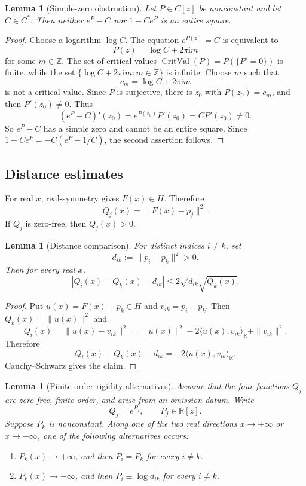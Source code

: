 \documentclass[11pt]{amsart}
\def\HH{H}%
\def\CC{C}%
\numberwithin{equation}{section}
\newtheorem{lemma}[theorem]{Lemma}
\theoremstyle{definition}
\theoremstyle{remark}
\newcommand{\HH}{\mathbb H}
\newcommand{\CC}{\mathbb C}
\newcommand{\RR}{\mathbb R}
\newcommand{\ZZ}{\mathbb Z}
\newcommand{\CritVal}{\operatorname{CritVal}}
\begin{document}
\begin{lemma}[Simple-zero obstruction]\label{lem:simple-zero}
Let $P\in\CC[z]$ be nonconstant and let $C\in\CC^*$. Then neither $e^P-C$ nor $1-Ce^P$ is an entire square.
\end{lemma}

\begin{proof}
Choose a logarithm $\log C$. The equation $e^{P(z)}=C$ is equivalent to
\[
P(z)=\log C+2\pi\mathrm i m
\]
for some $m\in\ZZ$. The set of critical values
$\CritVal(P)=P(\{P'=0\})$ is finite, while the set
$\{\log C+2\pi\mathrm i m:m\in\ZZ\}$ is infinite. Choose $m$ such that
\[
c_m=\log C+2\pi\mathrm i m
\]
is not a critical value. Since $P$ is surjective, there is $z_0$ with $P(z_0)=c_m$, and then $P'(z_0)\neq0$. Thus
\[
(e^P-C)'(z_0)=e^{P(z_0)}P'(z_0)=CP'(z_0)\neq0.
\]
So $e^P-C$ has a simple zero and cannot be an entire square. Since $1-Ce^P=-C(e^P-1/C)$, the second assertion follows.
\end{proof}

\subsection{Distance estimates}

For real $x$, real-symmetry gives $F(x)\in\HH$. Therefore
\[
Q_j(x)=\|F(x)-p_j\|^2.
\]
If $Q_j$ is zero-free, then $Q_j(x)>0$.

\begin{lemma}[Distance comparison]\label{lem:distance-comparison}
For distinct indices $i\neq k$, set
\[
d_{ik}:=\|p_i-p_k\|^2>0.
\]
Then for every real $x$,
\[
\left|Q_i(x)-Q_k(x)-d_{ik}\right|
\le
2\sqrt{d_{ik}}\sqrt{Q_k(x)}.
\]
\end{lemma}

\begin{proof}
Put $u(x)=F(x)-p_k\in\HH$ and $v_{ik}=p_i-p_k$. Then $Q_k(x)=\|u(x)\|^2$ and
\[
Q_i(x)=\|u(x)-v_{ik}\|^2=\|u(x)\|^2-2\langle u(x),v_{ik}\rangle_{\RR}+\|v_{ik}\|^2.
\]
Therefore
\[
Q_i(x)-Q_k(x)-d_{ik}=-2\langle u(x),v_{ik}\rangle_{\RR}.
\]
Cauchy--Schwarz gives the claim.
\end{proof}

\begin{lemma}[Finite-order rigidity alternatives]\label{lem:rigidity-alternatives}
Assume that the four functions $Q_j$ are zero-free, finite-order, and arise from an omission datum. Write
\[
Q_j=e^{P_j},\qquad P_j\in\RR[z].
\]
Suppose $P_k$ is nonconstant. Along one of the two real directions $x\to+\infty$ or $x\to-\infty$, one of the following alternatives occurs:
\begin{enumerate}[label=(\Alph*)]
\item $P_k(x)\to+\infty$, and then $P_i=P_k$ for every $i\neq k$.
\item $P_k(x)\to-\infty$, and then $P_i\equiv\log d_{ik}$ for every $i\neq k$.
\end{enumerate}
\end{lemma}
\end{document}
